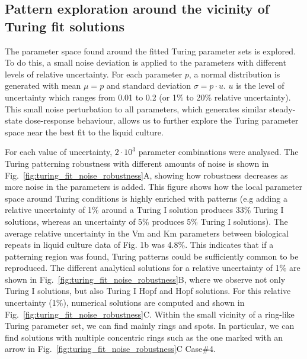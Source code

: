 \subsection{Pattern exploration around the vicinity of Turing fit solutions}
The parameter space found around the fitted Turing parameter sets is explored. To do this, a small noise deviation is applied to the parameters with different levels of relative uncertainty.
For each parameter $p$, a normal distribution is generated with mean $\mu=p$ and standard deviation $\sigma=p\cdot u$. $u$ is the level of uncertainty which ranges from 0.01 to 0.2 (or 1\% to 20\% relative uncertainty).
This small noise perturbation to all parameters, which generates similar steady-state dose-response behaviour, allows us to further explore the Turing parameter space near the best fit to the liquid culture.

For each value of uncertainty, $2\cdot10^3$ parameter combinations were analysed.
The Turing patterning robustness with different amounts of noise is shown in Fig.~\ref{fig:turing_fit_noise_robustness}A, showing how robustness decreases as more noise in the parameters is added.
This figure shows how the local parameter space around Turing conditions is highly enriched with patterns (e.g adding a relative uncertainty of 1\% around a Turing I solution produces 33\% Turing I solutions, whereas an uncertainty of 5\% produces 5\% Turing I solutions).
The average relative uncertainty in the Vm and Km parameters between biological repeats in liquid culture data of Fig. 1b was 4.8\%.
This indicates that if a patterning region was found, Turing patterns could be sufficiently common to be reproduced.
The different analytical solutions for a relative uncertainty of 1\% are shown in Fig.~\ref{fig:turing_fit_noise_robustness}B, where we observe not only Turing I solutions, but also Turing I Hopf and Hopf solutions.
For this relative uncertainty (1\%), numerical solutions are computed and shown in Fig.~\ref{fig:turing_fit_noise_robustness}C.
Within the small vicinity of a ring-like Turing parameter set, we can find mainly rings and spots.
In particular, we can find solutions with multiple concentric rings such as the one marked with an arrow in Fig.~\ref{fig:turing_fit_noise_robustness}C Case\#4.

